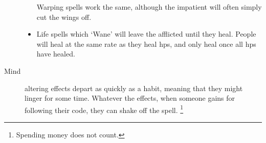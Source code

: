 \begin{multicols}{2}
\begin{description}
\begin{itemize}
    Warping spells work the same, although the impatient will often simply cut the wings off.
    \item
    Life spells which `Wane' will leave the afflicted until they heal.
    People will heal at the same rate as they heal \glspl{hp}, and only heal once all \glspl{hp} have healed.
  \end{itemize}
  \item[Mind]
  altering effects depart as quickly as a habit, meaning that they might linger for some time.
  Whatever the effects, when someone gains  for following their code, they can shake off the spell.%
  \footnote{Spending money does not count.}
\end{description}

\end{multicols}

